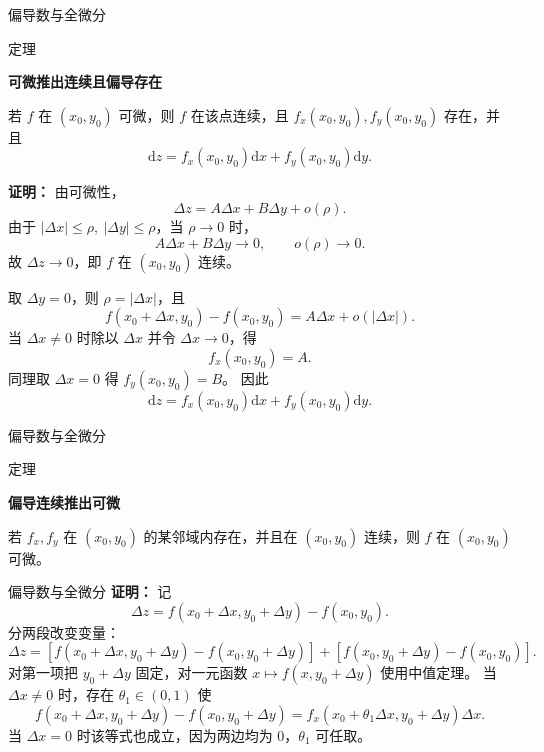 \documentclass[aspectratio=169,10pt,fontset=fandol]{ctexbeamer}
\newcommand{\dd}{\mathrm{d}}
\begin{document}
\begin{frame}[t,fragile]{偏导数与全微分}
\footnotesize
\begin{block}{定理}
{\footnotesize
\textbf{可微推出连续且偏导存在}\par

若 $f$ 在 $(x_0,y_0)$ 可微，则 $f$ 在该点连续，且 $f_x(x_0,y_0),f_y(x_0,y_0)$ 存在，并且
\[
\dd z=f_x(x_0,y_0)\dd x+f_y(x_0,y_0)\dd y.
\]

}
\end{block}
\pause
{\footnotesize
\textbf{证明：}
由可微性，
\[
\Delta z=A\Delta x+B\Delta y+o(\rho).
\]
由于 $|\Delta x|\leq\rho,\ |\Delta y|\leq\rho$，当 $\rho\to0$ 时，
\[
A\Delta x+B\Delta y\to0,\qquad o(\rho)\to0.
\]
故 $\Delta z\to0$，即 $f$ 在 $(x_0,y_0)$ 连续。

取 $\Delta y=0$，则 $\rho=|\Delta x|$，且
\[
f(x_0+\Delta x,y_0)-f(x_0,y_0)=A\Delta x+o(|\Delta x|).
\]
当 $\Delta x\neq0$ 时除以 $\Delta x$ 并令 $\Delta x\to0$，得
\[
f_x(x_0,y_0)=A.
\]
同理取 $\Delta x=0$ 得 $f_y(x_0,y_0)=B$。 因此
\[
\dd z=f_x(x_0,y_0)\dd x+f_y(x_0,y_0)\dd y.
\]

}
\end{frame}
\begin{frame}[t,fragile]{偏导数与全微分}
\footnotesize
\begin{block}{定理}
{\footnotesize
\textbf{偏导连续推出可微}\par

若 $f_x,f_y$ 在 $(x_0,y_0)$ 的某邻域内存在，并且在 $(x_0,y_0)$ 连续，则 $f$ 在 $(x_0,y_0)$ 可微。

}
\end{block}
\end{frame}
\begin{frame}[t,fragile]{偏导数与全微分}
\footnotesize
{\footnotesize
\textbf{证明：}
记
\[
\Delta z=f(x_0+\Delta x,y_0+\Delta y)-f(x_0,y_0).
\]
分两段改变变量：
\[
\Delta z=[f(x_0+\Delta x,y_0+\Delta y)-f(x_0,y_0+\Delta y)]
+[f(x_0,y_0+\Delta y)-f(x_0,y_0)].
\]
对第一项把 $y_0+\Delta y$ 固定，对一元函数 $x\mapsto f(x,y_0+\Delta y)$ 使用中值定理。 当 $\Delta x\neq0$ 时，存在 $\theta_1\in(0,1)$ 使
\[
f(x_0+\Delta x,y_0+\Delta y)-f(x_0,y_0+\Delta y)
=f_x(x_0+\theta_1\Delta x,y_0+\Delta y)\Delta x.
\]
当 $\Delta x=0$ 时该等式也成立，因为两边均为 $0$，$\theta_1$ 可任取。
}
\end{frame}
\end{document}
